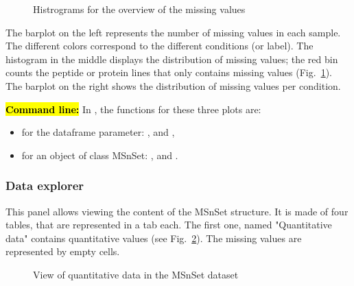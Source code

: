 \documentclass[12pt]{article}
\begin{document}
{\begin {figure}
\centering
{}
\caption{Histrograms for the overview of the missing values}\label{fig:sdmv}
\end {figure}

The barplot on the left represents the number of missing values in each 
sample. The different colors correspond to the different conditions (or label).
The histogram in the middle displays the distribution of missing values; the 
red bin counts the peptide or protein lines that only contains missing values 
(Fig.~\ref{fig:sdmv}).
{The barplot on the right shows the distribution of missing values per 
condition.}

\hl{\bf Command line:} In , the functions for these three 
plots are:
\begin{itemize}
\item for the dataframe parameter: , 
 and ,
\item for an object of class MSnSet: , 
 and 
.
\end{itemize}


\subsubsection {Data explorer}\label{sec:dataexplorer}
This panel allows viewing the content of the MSnSet structure. It is made of 
four tables, that are represented in a tab each. 
The first one, named "Quantitative data" contains quantitative values 
(see Fig.~\ref{fig:sdqv1}). The missing values are represented by empty cells.

\begin {figure}
\centering
{}
\caption{View of quantitative data in the MSnSet dataset}\label{fig:sdqv1}
\end {figure}


}
\end{document}
